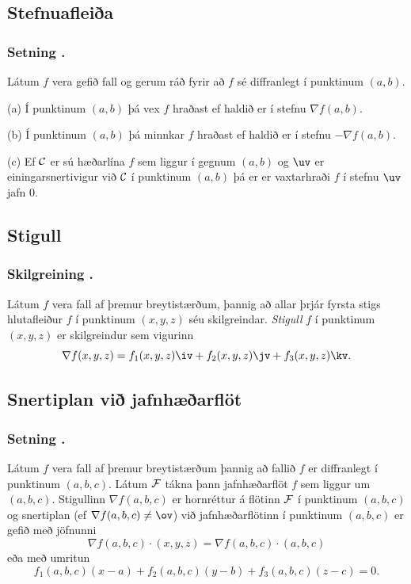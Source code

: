 \subsection{Stefnuafleiða} 

\subsubsection{Setning \kaflanr.}
Látum $f$ vera gefið fall og gerum ráð fyrir að
$f$ sé diffranlegt í punktinum $(a,b)$.  

\medskip
(a) Í punktinum $(a,b)$ þá vex $f$ hraðast ef haldið er í stefnu
$\nabla f(a,b)$.  

\medskip
(b) Í punktinum $(a,b)$ þá minnkar $f$ hraðast ef haldið er í stefnu
$-\nabla f(a,b)$.  

\medskip
(c)  Ef $\cal C$ er sú hæðarlína $f$ sem liggur í gegnum $(a,b)$ og
$\uv$ er einingarsnertivigur við $\cal C$ í punktinum $(a,b)$ þá er
er vaxtarhraði $f$ í stefnu $\uv$ jafn 0. 




\subsection{Stigull} 

\subsubsection{Skilgreining \kaflanr.}
 Látum $f$ vera fall af þremur
breytistærðum, þannig að allar þrjár fyrsta stigs hlutafleiður $f$ í
punktinum $(x,y,z)$ séu skilgreindar.  {\em Stigull} $f$ í punktinum
$(x,y,z)$ er skilgreindur sem vigurinn
$$\nabla f(x,y,z)=f_1(x,y,z)\iv+f_2(x,y,z)\jv+f_3(x,y,z)\kv.$$





\subsection{Snertiplan við jafnhæðarflöt} 

\subsubsection{Setning \kaflanr.}
 Látum $f$ vera fall af þremur
breytistærðum þannig að fallið $f$ er diffranlegt í punktinum $(a,b,c)$.  Látum $\cal F$ tákna þann jafnhæðarflöt $f$ sem liggur um $(a,b,c)$.  Stigullinn $\nabla f(a,b,c)$ er hornréttur á flötinn $\cal F$ í punktinum $(a,b,c)$ og snertiplan (ef $\nabla f(a,b,c)\neq\ov$) 
við jafnhæðarflötinn í punktinum $(a,b,c)$ er gefið með jöfnunni 
$$\nabla f(a,b,c)\cdot(x,y,z)=\nabla f(a,b,c)\cdot(a,b,c)$$
eða með umritun
$$f_1(a,b,c)(x-a)+f_2(a,b,c)(y-b)+f_3(a,b,c)(z-c)=0.$$






